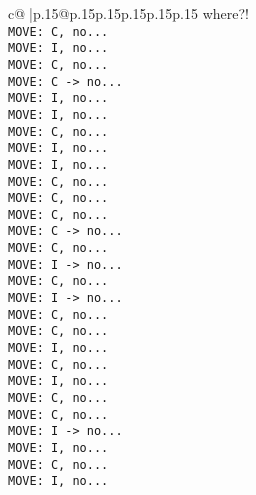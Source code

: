 \documentclass{article}
\begin{document}
{\begin{supertabular}{c@{$\;$}|p{.15\linewidth}@{}p{.15\linewidth}p{.15\linewidth}p{.15\linewidth}p{.15\linewidth}p{.15\linewidth}}
{{{where?!\\ \tt  MOVE: C, no...\\ \tt  MOVE: I, no...\\ \tt  MOVE: C, no...\\ \tt  MOVE: C -> no...\\ \tt  MOVE: I, no...\\ \tt  MOVE: I, no...\\ \tt  MOVE: C, no...\\ \tt  MOVE: I, no...\\ \tt  MOVE: I, no...\\ \tt  MOVE: C, no...\\ \tt  MOVE: C, no...\\ \tt  MOVE: C, no...\\ \tt  MOVE: C -> no...\\ \tt  MOVE: C, no...\\ \tt  MOVE: I -> no...\\ \tt  MOVE: C, no...\\ \tt  MOVE: I -> no...\\ \tt  MOVE: C, no...\\ \tt  MOVE: C, no...\\ \tt  MOVE: I, no...\\ \tt  MOVE: C, no...\\ \tt  MOVE: I, no...\\ \tt  MOVE: C, no...\\ \tt  MOVE: C, no...\\ \tt  MOVE: I -> no...\\ \tt  MOVE: I, no...\\ \tt  MOVE: C, no...\\ \tt  MOVE: I, no...\\ \tt  }}}
\end{supertabular}}
\end{document}
